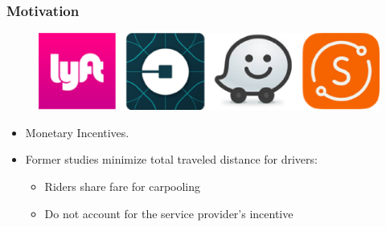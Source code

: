 \documentclass[t]{beamer}
\begin{document}
\begin{frame}\frametitle{Motivation}
\vspace{-0.28in}
\begin{figure}
	\centering
    \includegraphics[width = 0.55\columnwidth]{ride-sharings.eps}
\end{figure}
\vspace{-0.23in}
\begin{itemize}
\item Monetary Incentives.
\item<2-> Former studies minimize total traveled distance for drivers:
\begin{itemize}
\item<2-> Riders share fare for carpooling
\item<5-> Do not account for the service provider's incentive
\end{itemize}
\vspace{-0.1in}
\end{itemize}
\end{frame}
\end{document}
